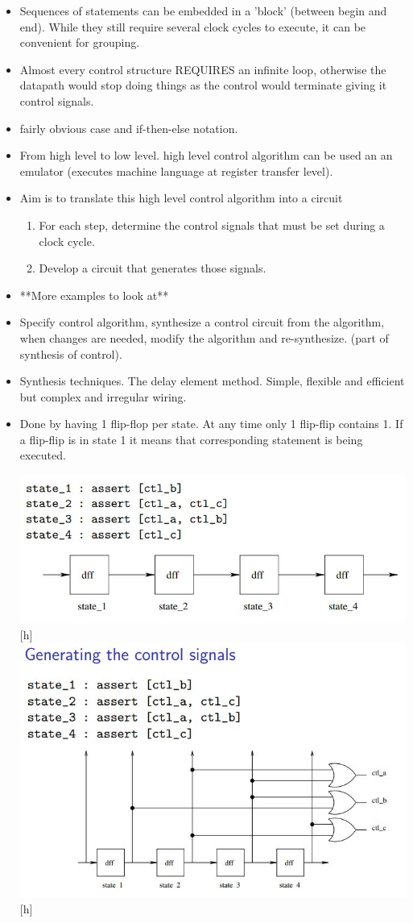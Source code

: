 \documentclass{article}
\begin{document}
\begin{itemize}
\item Sequences of statements can be embedded in a 'block' (between begin and end). While they still require several clock cycles to execute, it can be convenient for grouping.
\item Almost every control structure REQUIRES an infinite loop, otherwise the datapath would stop doing things as the control would terminate giving it control signals.
\item fairly obvious case and if-then-else notation.
\item From high level to low level. high level control algorithm can be used an an emulator (executes machine language at register transfer level).
\item Aim is to translate this high level control algorithm into a circuit
\begin{enumerate}
\item For each step, determine the control signals that must be set during a clock cycle.
\item Develop a circuit that generates those signals.
\end{enumerate}
\item **More examples to look at**
\item Specify control algorithm, synthesize a control circuit from the algorithm, when changes are needed, modify the algorithm and re-synthesize. (part of synthesis of control).
\item Synthesis techniques. The delay element method. Simple, flexible and efficient but complex and irregular wiring.
\item Done by having 1 flip-flop per state. At any time only 1 flip-flip contains 1. If a flip-flip is in state 1 it means that corresponding statement is being executed.

\includegraphics[width=\linewidth]{sdff}[h]
\includegraphics[width=\linewidth]{gcs}[h]


\end{itemize}
\end{document}
